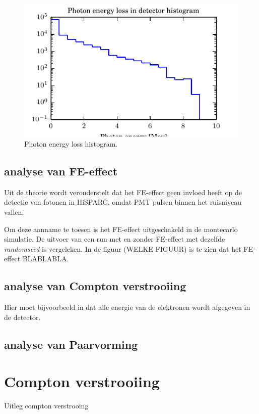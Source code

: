 \documentclass[a4paper,11pt]{article}
\begin{document}
\begin{figure}[t]
  \begin{center}
    \includegraphics{figure1.pdf}
    \caption{\label{fig:Eloss-hist} Photon energy loss histogram.}
  \end{center}
\end{figure}



\subsection{analyse van FE-effect}
Uit de theorie wordt veronderstelt dat het FE-effect geen invloed heeft op de detectie van fotonen in HiSPARC, omdat PMT pulsen binnen het ruisniveau vallen.

Om deze aanname te toesen is het FE-effect uitgeschakeld in de montecarlo simulatie. De uitvoer van een run met en zonder FE-effect met dezelfde \textit{randomseed} is vergeleken. In de figuur (WELKE FIGUUR) is te zien dat het FE-effect BLABLABLA.

\subsection{analyse van Compton verstrooiing}
Hier moet bijvoorbeeld in dat alle energie van de elektronen wordt afgegeven in de detector.
\subsection{analyse van Paarvorming}

\section{Compton verstrooiing}
Uitleg compton verstrooing
\end{document}
